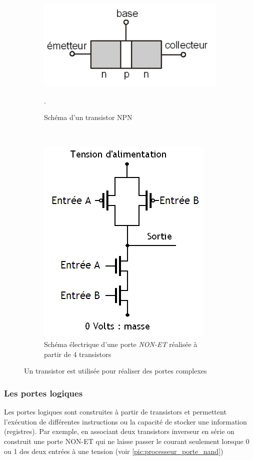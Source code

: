 \begin{figure}[htbp]
    \centering
    \begin{subfigure}[b]{0.45\linewidth}\centering
        \includegraphics[width=\linewidth]{images/transistor.png}
        \caption{\label{pic:transistor} Schéma d'un transistor NPN \cite{GeraldHuguenin2018}}.
    \end{subfigure}
    ~ %
    \begin{subfigure}[b]{0.45\linewidth}\centering
        \includegraphics[width=0.5\linewidth]{images/processeur_porte_nand.png}
        \caption{\label{pic:processeur_porte_nand} Schéma électrique d'une porte \textit{NON-ET} réalisée à partir de 4 transistors \cite{Wikibooks2019PorteNand}}
    \end{subfigure}
    \caption{Un transistor est utilisée pour réaliser des portes complexes  }\label{pic:transistor_usage}
\end{figure}




\subsubsection{Les portes logiques}
Les portes logiques sont construites à partir de transistors et permettent l'exécution de différentes instructions ou la capacité de stocker une information (registres). Par exemple, en associant deux transistors inverseur en série on construit une porte NON-ET qui ne laisse passer le courant seulement lorsque 0 ou 1 des deux entrées à une tension (voir \autoref{pic:processeur_porte_nand})



